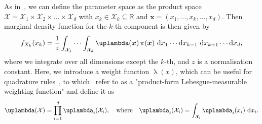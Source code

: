 As in~\cite{cui2022deep}, we can define the parameter space as the product space $\mathcal{X} = \mathcal{X}_1 \times \mathcal{X}_2 \times \dots \times \mathcal{X}_d$ with $ x_k \in \mathcal{X}_k \subseteq \mathbb{R}$ and $\bm{x} = ( x_1,\dots ,x_k,\dots,x_d )$.
Then marginal density function for the $k$-th component is then given by
\begin{align}
	f_{X_k}(x_k) = \frac{1}{z} \int_{\mathcal{X}_1} \cdots \int_{\mathcal{X}_d} \uplambda(\bm{x}) \, \pi(\bm{x}) \, \diff x_1 \cdots \diff x_{k-1} \, \diff x_{k+1} \cdots \diff x_d, \label{eq:margInt}
\end{align}
where we integrate over all dimensions except the $k$-th, and $z$ is a normalisation constant.
Here, we introduce a weight function $\uplambda(x)$, which can be useful for quadrature rules~\cite{davis2007methods}, to which~\cite{cui2022deep} refer to as a "product-form Lebesgue-measurable weighting function" and define it as
\begin{align}
	\uplambda(\mathcal{X}) = \prod_{i = 1}^{d} \uplambda_i(\mathcal{X}_i), \quad \text{where} \quad \uplambda_i(\mathcal{X}_i) = \int_{\mathcal{X}_i} \uplambda_i(x_i) \, \diff x_i. \label{eq:lebesgueWeight}
\end{align}

